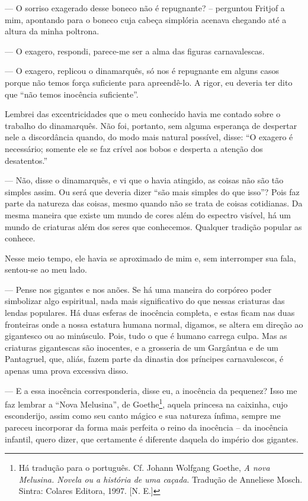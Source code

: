 --- O sorriso exagerado desse boneco não é repugnante? -- perguntou
Fritjof a mim, apontando para o boneco cuja cabeça simplória acenava
chegando até a altura da minha poltrona.

--- O exagero, respondi, parece-me ser a alma das figuras carnavalescas.

--- O exagero, replicou o dinamarquês, só nos é repugnante em alguns
casos porque não temos força suficiente para apreendê-lo. A rigor, eu
deveria ter dito que ``não temos inocência suficiente''.

Lembrei das excentricidades que o meu conhecido havia me contado sobre o
trabalho do dinamarquês. Não foi, portanto, sem alguma esperança de
despertar nele a discordância quando, do modo mais natural possível,
disse: ``O exagero é necessário; somente ele se faz crível aos bobos e
desperta a atenção dos desatentos.''

--- Não, disse o dinamarquês, e vi que o havia atingido, as coisas não
são tão simples assim. Ou será que deveria dizer ``são mais simples do
que isso''? Pois faz parte da natureza das coisas, mesmo quando não se
trata de coisas cotidianas. Da mesma maneira que existe um mundo de
cores além do espectro visível, há um mundo de criaturas além dos seres
que conhecemos. Qualquer tradição popular as conhece.

Nesse meio tempo, ele havia se aproximado de mim e, sem interromper sua
fala, sentou-se ao meu lado.

--- Pense nos gigantes e nos anões. Se há uma maneira do corpóreo poder
simbolizar algo espiritual, nada mais significativo do que nessas
criaturas das lendas populares. Há duas esferas de inocência completa, e
estas ficam nas duas fronteiras onde a nossa estatura humana normal,
digamos, se altera em direção ao gigantesco ou ao minúsculo. Pois, tudo
o que é humano carrega culpa. Mas as criaturas gigantescas são
inocentes, e a grosseria de um Gargântua e de um Pantagruel, que, aliás,
fazem parte da dinastia dos príncipes carnavalescos, é apenas uma prova
excessiva disso.

--- E a essa inocência corresponderia, disse eu, a inocência da pequenez?
Isso me faz lembrar a ``Nova Melusina'', de Goethe\footnote{Há tradução
  para o português. Cf. Johann Wolfgang Goethe, \emph{A nova Melusina.
  Novela ou a história de uma caçada}. Tradução de Anneliese Mosch.
  Sintra: Colares Editora, 1997. [N. E.]}, aquela princesa na
caixinha, cujo esconderijo, assim como seu canto mágico e sua natureza
ínfima, sempre me pareceu incorporar da forma mais perfeita o reino da
inocência -- da inocência infantil, quero dizer, que certamente é
diferente daquela do império dos gigantes.


